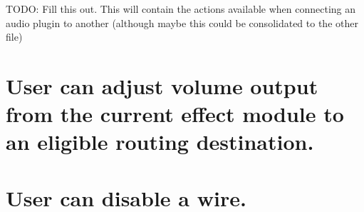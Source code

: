 TODO: Fill this out. This will contain the actions available when connecting an audio plugin to another (although maybe this could be consolidated to the other file)

\section{User can adjust volume output from the current effect module to an eligible routing destination.}


\section{User can disable a wire.}
